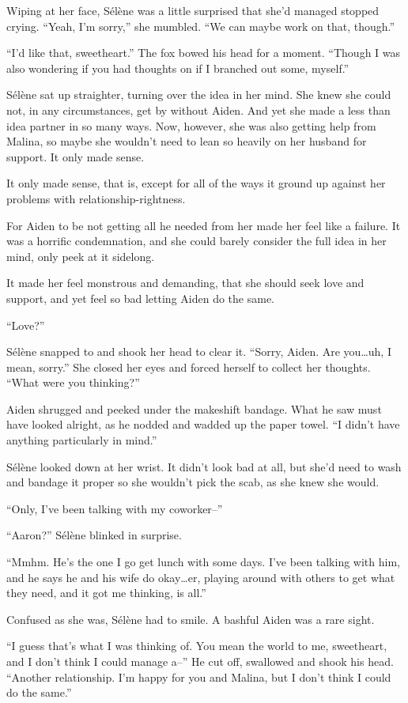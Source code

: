 Wiping at her face, Sélène was a little surprised that she'd managed stopped crying. ``Yeah, I'm sorry,'' she mumbled. ``We can maybe work on that, though.''

``I'd like that, sweetheart.'' The fox bowed his head for a moment. ``Though I was also wondering if you had thoughts on if I branched out some, myself.''

Sélène sat up straighter, turning over the idea in her mind. She knew she could not, in any circumstances, get by without Aiden. And yet she made a less than idea partner in so many ways. Now, however, she was also getting help from Malina, so maybe she wouldn't need to lean so heavily on her husband for support. It only made sense.

It only made sense, that is, except for all of the ways it ground up against her problems with relationship-rightness.

For Aiden to be not getting all he needed from her made her feel like a failure. It was a horrific condemnation, and she could barely consider the full idea in her mind, only peek at it sidelong.

It made her feel monstrous and demanding, that she should seek love and support, and yet feel so bad letting Aiden do the same.

``Love?''

Sélène snapped to and shook her head to clear it. ``Sorry, Aiden. Are you\ldots{}uh, I mean, sorry.'' She closed her eyes and forced herself to collect her thoughts. ``What were you thinking?''

Aiden shrugged and peeked under the makeshift bandage. What he saw must have looked alright, as he nodded and wadded up the paper towel. ``I didn't have anything particularly in mind.''

Sélène looked down at her wrist. It didn't look bad at all, but she'd need to wash and bandage it proper so she wouldn't pick the scab, as she knew she would.

``Only, I've been talking with my coworker--''

``Aaron?'' Sélène blinked in surprise.

``Mmhm. He's the one I go get lunch with some days. I've been talking with him, and he says he and his wife do okay\ldots{}er, playing around with others to get what they need, and it got me thinking, is all.''

Confused as she was, Sélène had to smile. A bashful Aiden was a rare sight.

``I guess that's what I was thinking of. You mean the world to me, sweetheart, and I don't think I could manage a--'' He cut off, swallowed and shook his head. ``Another relationship. I'm happy for you and Malina, but I don't think I could do the same.''

